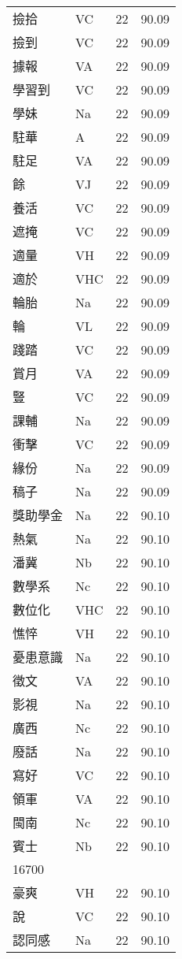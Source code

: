 \documentclass[twocolumn]{book}
\begin{document}
\begin{supertabular}{llrr}
撿拾 & VC & 22 &  90.09\\
撿到 & VC & 22 &  90.09\\
據報 & VA & 22 &  90.09\\
學習到 & VC & 22 &  90.09\\
學妹 & Na & 22 &  90.09\\
駐華 & A & 22 &  90.09\\
駐足 & VA & 22 &  90.09\\
餘 & VJ & 22 &  90.09\\
養活 & VC & 22 &  90.09\\
遮掩 & VC & 22 &  90.09\\
適量 & VH & 22 &  90.09\\
適於 & VHC & 22 &  90.09\\
輪胎 & Na & 22 &  90.09\\
輪 & VL & 22 &  90.09\\
踐踏 & VC & 22 &  90.09\\
賞月 & VA & 22 &  90.09\\
豎 & VC & 22 &  90.09\\
課輔 & Na & 22 &  90.09\\
衝擊 & VC & 22 &  90.09\\
緣份 & Na & 22 &  90.09\\
稿子 & Na & 22 &  90.09\\
獎助學金 & Na & 22 &  90.10\\
熱氣 & Na & 22 &  90.10\\
潘冀 & Nb & 22 &  90.10\\
數學系 & Nc & 22 &  90.10\\
數位化 & VHC & 22 &  90.10\\
憔悴 & VH & 22 &  90.10\\
憂患意識 & Na & 22 &  90.10\\
徵文 & VA & 22 &  90.10\\
影視 & Na & 22 &  90.10\\
廣西 & Nc & 22 &  90.10\\
廢話 & Na & 22 &  90.10\\
寫好 & VC & 22 &  90.10\\
領軍 & VA & 22 &  90.10\\
閩南 & Nc & 22 &  90.10\\
賓士 & Nb & 22 &  90.10\\
16700\\
豪爽 & VH & 22 &  90.10\\
說 & VC & 22 &  90.10\\
認同感 & Na & 22 &  90.10\\

\end{supertabular}
\end{document}
